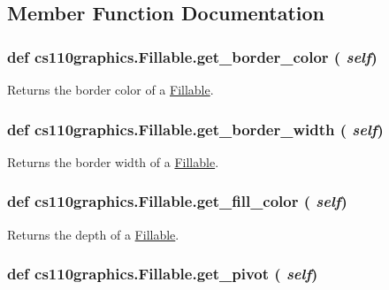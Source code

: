 \subsection{Member Function Documentation}
\hypertarget{classcs110graphics_1_1Fillable_a6772d56158c9fe98a33f01d47cb8aa41}{
\subsubsection[{get\_\-border\_\-color}]{\setlength{\rightskip}{0pt plus 5cm}def cs110graphics.Fillable.get\_\-border\_\-color ( {\em self})}}
\label{classcs110graphics_1_1Fillable_a6772d56158c9fe98a33f01d47cb8aa41}


Returns the border color of a \hyperlink{classcs110graphics_1_1Fillable}{Fillable}. \hypertarget{classcs110graphics_1_1Fillable_a6ed7a4288e84a090ec185c8bdff21d0f}{
\subsubsection[{get\_\-border\_\-width}]{\setlength{\rightskip}{0pt plus 5cm}def cs110graphics.Fillable.get\_\-border\_\-width ( {\em self})}}
\label{classcs110graphics_1_1Fillable_a6ed7a4288e84a090ec185c8bdff21d0f}


Returns the border width of a \hyperlink{classcs110graphics_1_1Fillable}{Fillable}. \hypertarget{classcs110graphics_1_1Fillable_a16c045bc9b63961b696914ee1a1d14d9}{
\subsubsection[{get\_\-fill\_\-color}]{\setlength{\rightskip}{0pt plus 5cm}def cs110graphics.Fillable.get\_\-fill\_\-color ( {\em self})}}
\label{classcs110graphics_1_1Fillable_a16c045bc9b63961b696914ee1a1d14d9}


Returns the depth of a \hyperlink{classcs110graphics_1_1Fillable}{Fillable}. \hypertarget{classcs110graphics_1_1Fillable_a514fa0d21297c1372681afae9219fd58}{
\subsubsection[{get\_\-pivot}]{\setlength{\rightskip}{0pt plus 5cm}def cs110graphics.Fillable.get\_\-pivot ( {\em self})}}
\label{classcs110graphics_1_1Fillable_a514fa0d21297c1372681afae9219fd58}


